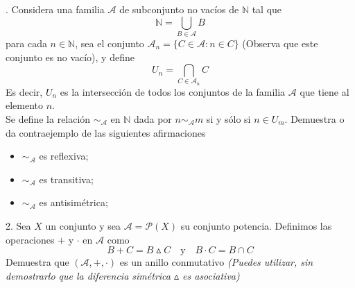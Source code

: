 \documentclass[letterpaper]{article}
\newcommand{\A}{\mathcal{A}}
\newcommand{\ra}{\sim_{\A}}
\newcommand{\N}{\mathds{N}}
\renewcommand{\*}{\cdot}
\theoremstyle{definition}
\begin{document}
. Considera una familia $ \A $ de subconjunto no vacíos de $ \N $ tal que \[ \N = \bigcup_{B \in \A} B \] para cada $ n \in \N $, sea el conjunto $ \A_{n}  = \lbrace C \in \A : n\in C \rbrace$ (Observa que este conjunto es no vacío), y define \[ U_n = \bigcap_{C \in \A_n} C \] Es decir, $ U_n $ es la intersección de todos los conjuntos de la familia $ \A $ que tiene al elemento $ n $.\\ Se define la relación $ \ra $ en $ \N $ dada por $ n \ra m $ si y sólo si $ n \in U_m $. Demuestra o da contraejemplo de las siguientes afirmaciones
\begin{itemize}
	\item$ \ra $ es reflexiva;
	\item$ \ra $ es transitiva;
	\item$ \ra $ es antisimétrica;
\end{itemize}

2. Sea $ X $ un conjunto y sea $ \mathcal{A} = \mathcal{P}(X) $ su conjunto potencia. Definimos las operaciones $ + $ y $ \* $ en $ \mathcal{A} $ como 
\[ B + C = B \vartriangle C \quad \text{y} \quad B \* C = B \cap C \]
Demuestra que $ (\mathcal{A}, +, \*) $ es un anillo conmutativo
\textit{(Puedes utilizar, sin demostrarlo que la diferencia simétrica $ \vartriangle $ es asociativa)}
\end{document}
